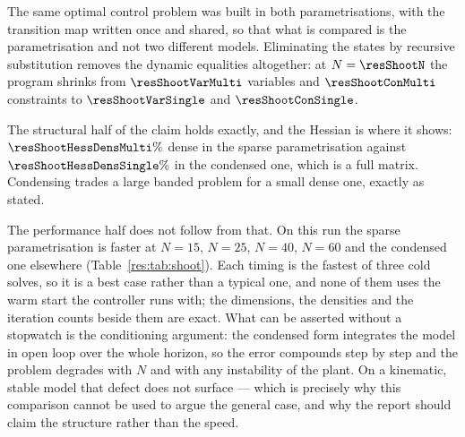 \begin{table}[htbp]
  \centering
  \small
  \caption{Size and sparsity of the NLP against the prediction horizon, from the deployed profile. Bold: the deployed configuration.}
  \label{res:tab:nlp}
\end{table}

\label{res:shoot}


The same optimal control problem was built in both parametrisations, with the transition map written once and shared, so that what is compared is the parametrisation and not two different models. Eliminating the states by recursive substitution removes the dynamic equalities altogether: at $N=\resShootN$ the program shrinks from $\resShootVarMulti$ variables and $\resShootConMulti$ constraints to $\resShootVarSingle$ and $\resShootConSingle$.

The structural half of the claim holds exactly, and the Hessian is where it shows: $\resShootHessDensMulti\%$ dense in the sparse parametrisation against $\resShootHessDensSingle\%$ in the condensed one, which is a full matrix. Condensing trades a large banded problem for a small dense one, exactly as stated.

The performance half does not follow from that. On this run the sparse parametrisation is faster at $N=15$, $N=25$, $N=40$, $N=60$ and the condensed one elsewhere (Table~\ref{res:tab:shoot}). Each timing is the fastest of three cold solves, so it is a best case rather than a typical one, and none of them uses the warm start the controller runs with; the dimensions, the densities and the iteration counts beside them are exact. What can be asserted without a stopwatch is the conditioning argument: the condensed form integrates the model in open loop over the whole horizon, so the error compounds step by step and the problem degrades with $N$ and with any instability of the plant. On a kinematic, stable model that defect does not surface --- which is precisely why this comparison cannot be used to argue the general case, and why the report should claim the structure rather than the speed.


